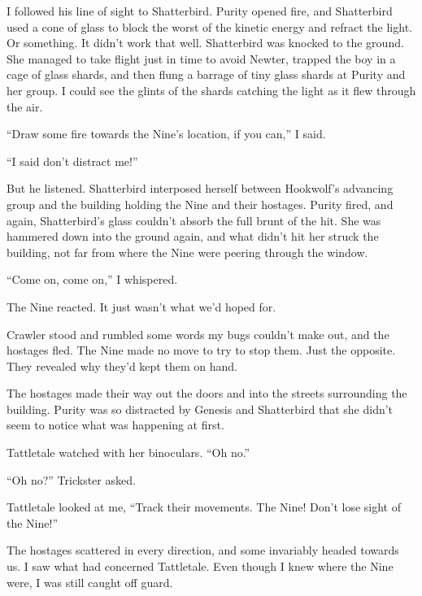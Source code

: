I followed his line of sight to Shatterbird.  Purity opened fire, and Shatterbird used a cone of glass to block the worst of the kinetic energy and refract the light.  Or something.  It didn't work that well.  Shatterbird was knocked to the ground.  She managed to take flight just in time to avoid Newter, trapped the boy in a cage of glass shards, and then flung a barrage of tiny glass shards at Purity and her group.  I could see the glints of the shards catching the light as it flew through the air.



``Draw some fire towards the Nine's location, if you can,'' I said.



``I said don't distract me!''



But he listened.  Shatterbird interposed herself between Hookwolf's advancing group and the building holding the Nine and their hostages.  Purity fired, and again, Shatterbird's glass couldn't absorb the full brunt of the hit.  She was hammered down into the ground again, and what didn't hit her struck the building, not far from where the Nine were peering through the window.



``Come on, come on,'' I whispered.



The Nine reacted.  It just wasn't what we'd hoped for.



Crawler stood and rumbled some words my bugs couldn't make out, and the hostages fled.  The Nine made no move to try to stop them.  Just the opposite.  They revealed why they'd kept them on hand.



The hostages made their way out the doors and into the streets surrounding the building.  Purity was so distracted by Genesis and Shatterbird that she didn't seem to notice what was happening at first.



Tattletale watched with her binoculars.  ``Oh no.''



``Oh no?''  Trickster asked.



Tattletale looked at me, ``Track their movements.  The Nine!  Don't lose sight of the Nine!''



The hostages scattered in every direction, and some invariably headed towards us.  I saw what had concerned Tattletale.  Even though I knew where the Nine were, I was still caught off guard.



